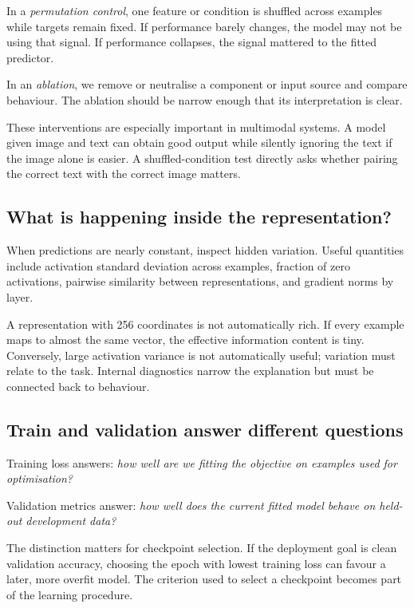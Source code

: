 In a \emph{permutation control}, one feature or condition is shuffled across examples while targets remain fixed. If performance barely changes, the model may not be using that signal. If performance collapses, the signal mattered to the fitted predictor.

In an \emph{ablation}, we remove or neutralise a component or input source and compare behaviour. The ablation should be narrow enough that its interpretation is clear.

These interventions are especially important in multimodal systems. A model given image and text can obtain good output while silently ignoring the text if the image alone is easier. A shuffled-condition test directly asks whether pairing the correct text with the correct image matters.

\subsection{What is happening inside the representation?}

When predictions are nearly constant, inspect hidden variation. Useful quantities include activation standard deviation across examples, fraction of zero activations, pairwise similarity between representations, and gradient norms by layer.

A representation with 256 coordinates is not automatically rich. If every example maps to almost the same vector, the effective information content is tiny. Conversely, large activation variance is not automatically useful; variation must relate to the task. Internal diagnostics narrow the explanation but must be connected back to behaviour.

\subsection{Train and validation answer different questions}

Training loss answers: \emph{how well are we fitting the objective on examples used for optimisation?}

Validation metrics answer: \emph{how well does the current fitted model behave on held-out development data?}

The distinction matters for checkpoint selection. If the deployment goal is clean validation accuracy, choosing the epoch with lowest training loss can favour a later, more overfit model. The criterion used to select a checkpoint becomes part of the learning procedure.

